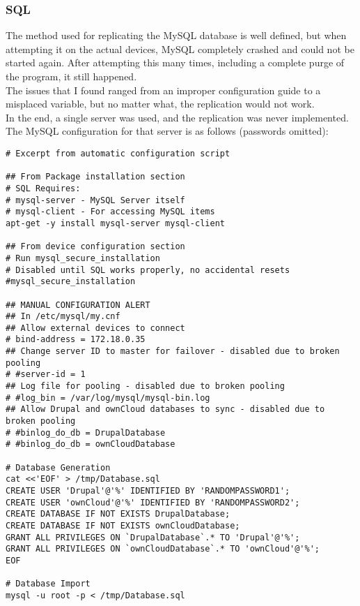 \documentclass[12pt]{spieman}  %
\begin{document}
\subsubsection{SQL}
\label{subsubsec:sql-config}

The method used for replicating the MySQL database is well defined, but when attempting it on the actual devices, MySQL completely crashed and could not be started again. After attempting this many times, including a complete purge of the program, it still happened.\\

The issues that I found ranged from an improper configuration guide to a misplaced variable, but no matter what, the replication would not work.\\

In the end, a single server was used, and the replication was never implemented. The MySQL configuration for that server is as follows (passwords omitted):

\begin{lstlisting}
# Excerpt from automatic configuration script

## From Package installation section
# SQL Requires:
# mysql-server - MySQL Server itself
# mysql-client - For accessing MySQL items
apt-get -y install mysql-server mysql-client

## From device configuration section
# Run mysql_secure_installation
# Disabled until SQL works properly, no accidental resets
#mysql_secure_installation

## MANUAL CONFIGURATION ALERT
## In /etc/mysql/my.cnf
## Allow external devices to connect
# bind-address = 172.18.0.35
## Change server ID to master for failover - disabled due to broken pooling
# #server-id = 1
## Log file for pooling - disabled due to broken pooling
# #log_bin = /var/log/mysql/mysql-bin.log
## Allow Drupal and ownCloud databases to sync - disabled due to broken pooling
# #binlog_do_db = DrupalDatabase
# #binlog_do_db = ownCloudDatabase

# Database Generation
cat <<'EOF' > /tmp/Database.sql
CREATE USER 'Drupal'@'%' IDENTIFIED BY 'RANDOMPASSWORD1';
CREATE USER 'ownCloud'@'%' IDENTIFIED BY 'RANDOMPASSWORD2';
CREATE DATABASE IF NOT EXISTS DrupalDatabase;
CREATE DATABASE IF NOT EXISTS ownCloudDatabase;
GRANT ALL PRIVILEGES ON `DrupalDatabase`.* TO 'Drupal'@'%';
GRANT ALL PRIVILEGES ON `ownCloudDatabase`.* TO 'ownCloud'@'%';
EOF

# Database Import
mysql -u root -p < /tmp/Database.sql
\end{lstlisting}
\end{document}
